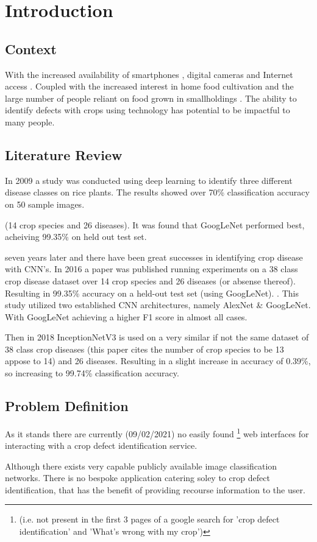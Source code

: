 \chapter{Introduction}
\label{introduction}

\section{Context}
  With the increased availability of smartphones \cite{Statista:2021}, digital cameras \cite{ImarcGroup} and Internet access \cite{Wikipedia} \cite{Globaltt}. Coupled with the increased interest in home food cultivation \cite{Google} and the large number of people reliant on food grown in smallholdings \cite{JLIFADSmallHolders}. The ability to identify defects with crops using technology has potential to be impactful to many people.
\section{Literature Review}
  \par
  In 2009 a study was conducted using deep learning to identify three different disease classes on rice plants. The results showed over 70\% classification accuracy on 50 sample images. \cite{Anthonys2009}
  \par
   (14 crop species and 26 diseases). It was found that GoogLeNet performed best, acheiving 99.35\% on held out test set.
  \par
  seven years later and there have been great successes in identifying crop disease with CNN's. In 2016 a paper was published running experiments on a 38 class crop disease
  dataset over 14 crop species and 26 diseases (or absense thereof). Resulting in 99.35\% accuracy on a held-out test set (using GoogLeNet). \cite{Mohanty2016}. This study utilized two established CNN architectures, namely AlexNet \cite{Krizhevsky} & GoogLeNet. \cite{Szegedy_2015_CVPR} With GoogLeNet achieving a higher F1 score in almost all cases.
  \par
  Then in 2018 InceptionNetV3 is used on a very similar if not the same dataset of 38 class crop diseases (this paper cites the number of crop species to be 13 appose to 14) and 26 diseases. Resulting in a slight increase in accuracy of 0.39\%, so increasing to 99.74\% classification accuracy.
  \par
\section{Problem Definition}
  As it stands there are currently (09/02/2021) no easily found \footnote[1]{(i.e. not present in the first 3 pages of a google search for 'crop defect identification' and 'What's wrong with my crop')} web interfaces for interacting with a crop defect identification service.
  \par
  Although there exists very capable publicly available image classification networks. \cite{Yandex} There is no bespoke application catering soley to crop defect identification, that has the benefit of providing recourse information to the user.

